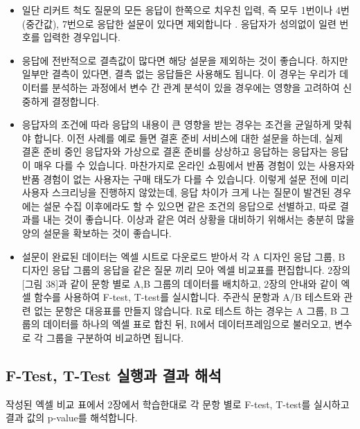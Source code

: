 \documentclass[
  letterpaper,
]{book}
\providecommand{\tightlist}{%
  \setlength{\itemsep}{0pt}\setlength{\parskip}{0pt}}\usepackage{longtable,booktabs,array}
\begin{document}
\begin{itemize}
\tightlist
\item
  일단 리커트 척도 질문의 모든 응답이 한쪽으로 치우친 입력, 즉 모두
  1번이나 4번(중간값), 7번으로 응답한 설문이 있다면 제외합니다 .
  응답자가 성의없이 일련 번호를 입력한 경우입니다.
\item
  응답에 전반적으로 결측값이 많다면 해당 설문을 제외하는 것이 좋습니다.
  하지만 일부만 결측이 있다면, 결측 없는 응답들은 사용해도 됩니다. 이
  경우는 우리가 데이터를 분석하는 과정에서 변수 간 관계 분석이 있을
  경우에는 영향을 고려하여 신중하게 결정합니다.
\item
  응답자의 조건에 따라 응답의 내용이 큰 영향을 받는 경우는 조건을
  균일하게 맞춰야 합니다. 이전 사례를 예로 들면 결혼 준비 서비스에 대한
  설문을 하는데, 실제 결혼 준비 중인 응답자와 가상으로 결혼 준비를
  상상하고 응답하는 응답자는 응답이 매우 다를 수 있습니다. 마찬가지로
  온라인 쇼핑에서 반품 경험이 있는 사용자와 반품 경험이 없는 사용자는
  구매 태도가 다를 수 있습니다. 이렇게 설문 전에 미리 사용자 스크리닝을
  진행하지 않았는데, 응답 차이가 크게 나는 질문이 발견된 경우에는 설문
  수집 이후에라도 할 수 있으면 같은 조건의 응답으로 선별하고, 따로
  결과를 내는 것이 좋습니다. 이상과 같은 여러 상황을 대비하기 위해서는
  충분히 많을 양의 설문을 확보하는 것이 좋습니다.
\item
  설문이 완료된 데이터는 엑셀 시트로 다운로드 받아서 각 A 디자인 응답
  그룹, B 디자인 응답 그룹의 응답을 같은 질문 끼리 모아 엑셀 비교표를
  편집합니다. 2장의 {[}그림 38{]}과 같이 문항 별로 A,B 그룹의 데이터를
  배치하고, 2장의 안내와 같이 엑셀 함수를 사용하여 F-test, T-test를
  실시합니다. 주관식 문항과 A/B 테스트와 관련 없는 문항은 대응표를
  만들지 않습니다. R로 테스트 하는 경우는 A 그룹, B 그룹의 데이터를
  하나의 엑셀 표로 합친 뒤, R에서 데이터프레임으로 불러오고, 변수로 각
  그룹을 구분하여 비교하면 됩니다.
\end{itemize}

\subsection{F-Test, T-Test 실행과 결과
해석}\label{f-test-t-test-uxc2e4uxd589uxacfc-uxacb0uxacfc-uxd574uxc11d}

작성된 엑셀 비교 표에서 2장에서 학습한대로 각 문항 별로 F-test, T-test를
실시하고 결과 값의 p-value를 해석합니다.
\end{document}
